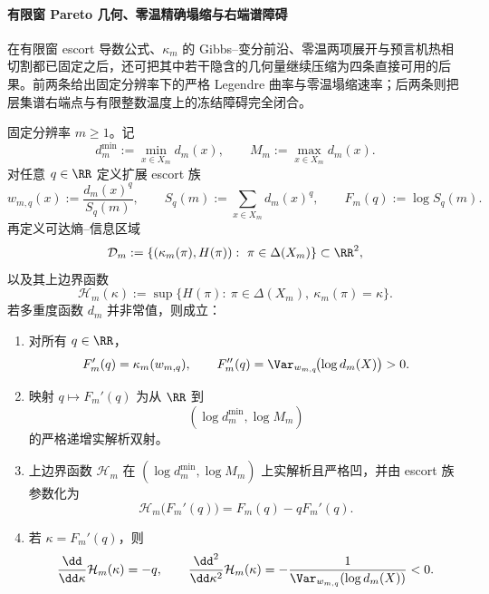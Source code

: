\paragraph{有限窗 Pareto 几何、零温精确塌缩与右端谱障碍}
在有限窗 escort 导数公式、\(\kappa_m\) 的 Gibbs--变分前沿、零温两项展开与预言机热相切割都已固定之后，还可把其中若干隐含的几何量继续压缩为四条直接可用的后果。前两条给出固定分辨率下的严格 Legendre 曲率与零温塌缩速率；后两条则把层集谱右端点与有限整数温度上的冻结障碍完全闭合。

\begin{theorem}\label{thm:pom-finite-pareto-legendre-curvature}
固定分辨率 \(m\ge 1\)。记
\[
d_m^{\min}:=\min_{x\in X_m}d_m(x),
\qquad
M_m:=\max_{x\in X_m}d_m(x).
\]
对任意 \(q\in\RR\) 定义扩展 escort 族
\[
w_{m,q}(x):=\frac{d_m(x)^q}{S_q(m)},
\qquad
S_q(m):=\sum_{x\in X_m}d_m(x)^q,
\qquad
F_m(q):=\log S_q(m).
\]
再定义可达熵--信息区域
\[
\mathcal D_m:=\{(\kappa_m(\pi),H(\pi)):\ \pi\in\Delta(X_m)\}\subset\RR^2,
\]
以及其上边界函数
\[
\mathcal H_m(\kappa):=
\sup\{H(\pi):\ \pi\in\Delta(X_m),\ \kappa_m(\pi)=\kappa\}.
\]
若多重度函数 \(d_m\) 并非常值，则成立：
\begin{enumerate}
  \item 对所有 \(q\in\RR\)，
  \[
  F_m'(q)=\kappa_m(w_{m,q}),
  \qquad
  F_m''(q)=\Var_{w_{m,q}}\!\bigl(\log d_m(X)\bigr)>0.
  \]
  \item 映射 \(q\mapsto F_m'(q)\) 为从 \(\RR\) 到
  \[
  (\log d_m^{\min},\log M_m)
  \]
  的严格递增实解析双射。
  \item 上边界函数 \(\mathcal H_m\) 在 \((\log d_m^{\min},\log M_m)\) 上实解析且严格凹，并由 escort 族参数化为
  \[
  \mathcal H_m\bigl(F_m'(q)\bigr)=F_m(q)-qF_m'(q).
  \]
  \item 若 \(\kappa=F_m'(q)\)，则
  \[
  \frac{\dd}{\dd\kappa}\mathcal H_m(\kappa)=-q,
  \qquad
  \frac{\dd^2}{\dd\kappa^2}\mathcal H_m(\kappa)
  =-\frac{1}{\Var_{w_{m,q}}(\log d_m(X))}<0.
  \]
\end{enumerate}
\end{theorem}
